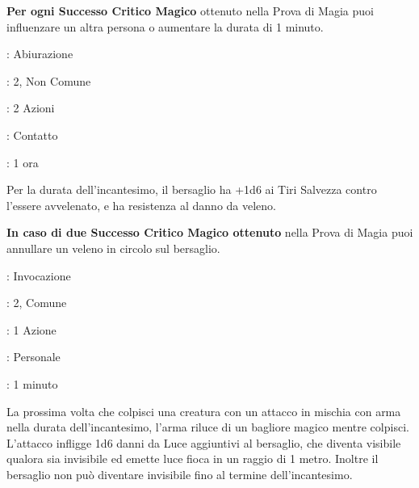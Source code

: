 \begin{multicols}{2}
\textbf{Per ogni Successo Critico Magico} ottenuto nella Prova di Magia puoi influenzare un altra persona o aumentare la durata di 1 minuto.

\noindent\colorbox{OBSSgold!10}{
\begin{minipage}{0.95\linewidth}
\begin{description}[noitemsep, topsep=0pt, parsep=0pt, partopsep=0pt, leftmargin=0cm, labelwidth=1.3cm]
	\item[\textbf{Lista}]: Abiurazione
	\item[\textbf{Livello}]: 2, Non Comune
	\item[\textbf{Lancio}]: 2 Azioni
	\item[\textbf{Gittata}]: Contatto
	\item[\textbf{Durata}]: 1 ora
\end{description}
\end{minipage}}\smallskip

Per la durata dell'incantesimo, il bersaglio ha +1d6 ai Tiri Salvezza contro l'essere avvelenato, e ha resistenza al danno da veleno.

\textbf{In caso di due Successo Critico Magico ottenuto} nella Prova di Magia puoi annullare un veleno in circolo sul bersaglio.

\noindent\colorbox{OBSSgold!10}{
\begin{minipage}{0.95\linewidth}
\begin{description}[noitemsep, topsep=0pt, parsep=0pt, partopsep=0pt, leftmargin=0cm, labelwidth=1.3cm]
	\item[\textbf{Lista}]: Invocazione
	\item[\textbf{Livello}]: 2, Comune
	\item[\textbf{Lancio}]: 1 Azione
	\item[\textbf{Gittata}]: Personale
	\item[\textbf{Durata}]: 1 minuto
\end{description}
\end{minipage}}\smallskip

La prossima volta che colpisci una creatura con un attacco in mischia con arma nella durata dell'incantesimo, l'arma riluce di un bagliore magico mentre colpisci. L'attacco infligge 1d6 danni da Luce aggiuntivi al bersaglio, che diventa visibile qualora sia invisibile ed emette luce fioca in un raggio di 1 metro. Inoltre il bersaglio non può diventare invisibile fino al termine dell'incantesimo.


\end{multicols}
